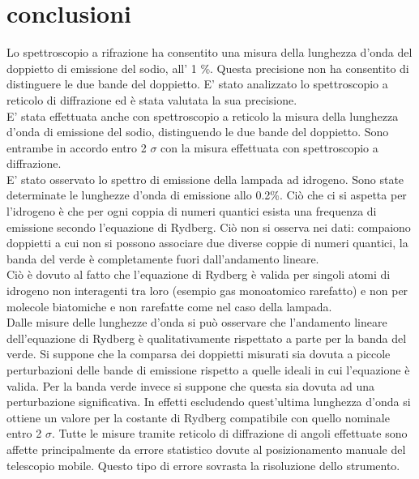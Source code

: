 \section{conclusioni}
Lo spettroscopio a rifrazione ha consentito una misura della lunghezza d'onda del doppietto di emissione del sodio, all' 1 \%. Questa precisione non ha consentito di distinguere le due bande del doppietto.
E' stato analizzato lo spettroscopio a reticolo di diffrazione ed è stata valutata la sua precisione.\\
E' stata effettuata anche con spettroscopio a reticolo la misura della lunghezza d'onda  di emissione del sodio, distinguendo le due bande del doppietto. Sono entrambe in accordo entro 2 $\sigma$ con la misura effettuata con spettroscopio a diffrazione.\\
E' stato osservato lo spettro di emissione della lampada ad idrogeno. Sono state determinate le lunghezze d'onda di emissione allo 0.2\%. Ciò che ci si aspetta per l'idrogeno è che per ogni coppia di numeri quantici esista una frequenza di emissione secondo l'equazione di Rydberg. Ciò non si osserva nei dati: compaiono doppietti a cui non si possono associare due diverse coppie di numeri quantici, la banda del verde è completamente fuori dall'andamento lineare. \\
Ciò è dovuto al fatto che l'equazione di Rydberg è valida per singoli atomi di idrogeno non interagenti tra loro (esempio gas monoatomico rarefatto) e non per molecole biatomiche e non rarefatte come nel caso della lampada.\\
Dalle misure delle lunghezze d'onda si può osservare che l'andamento lineare dell'equazione di Rydberg è qualitativamente rispettato a parte per la banda del verde. Si suppone che la comparsa dei doppietti misurati sia dovuta a piccole perturbazioni delle bande di emissione rispetto a quelle ideali in cui l'equazione è valida. Per la banda verde invece si suppone che questa sia dovuta ad una perturbazione significativa. In effetti escludendo quest'ultima lunghezza d'onda si ottiene un valore per la costante di Rydberg compatibile con quello nominale entro 2 $\sigma$.
Tutte le misure tramite reticolo di diffrazione di angoli effettuate sono affette principalmente da errore statistico dovute al posizionamento manuale del telescopio mobile. Questo tipo di errore sovrasta la risoluzione dello strumento.

